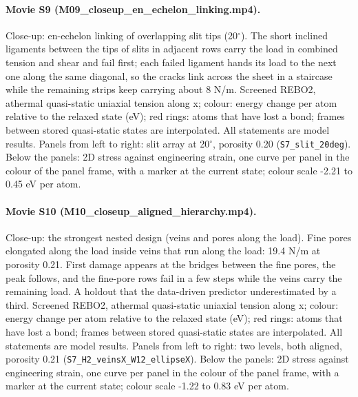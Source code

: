 \paragraph{Movie S9 (M09\_closeup\_en\_echelon\_linking.mp4).} Close-up: en-echelon linking of overlapping slit tips (20$^\circ$). The short inclined ligaments between the tips of slits in adjacent rows carry the load in combined tension and shear and fail first; each failed ligament hands its load to the next one along the same diagonal, so the cracks link across the sheet in a staircase while the remaining strips keep carrying about 8 N/m. Screened REBO2, athermal quasi-static uniaxial tension along x; colour: energy change per atom relative to the relaxed state (eV); red rings: atoms that have lost a bond; frames between stored quasi-static states are interpolated. All statements are model results. Panels from left to right: slit array at 20$^\circ$, porosity 0.20 (\texttt{S7\_slit\_20deg}). Below the panels: 2D stress against engineering strain, one curve per panel in the colour of the panel frame, with a marker at the current state; colour scale -2.21 to 0.45 eV per atom.

\paragraph{Movie S10 (M10\_closeup\_aligned\_hierarchy.mp4).} Close-up: the strongest nested design (veins and pores along the load). Fine pores elongated along the load inside veins that run along the load: 19.4 N/m at porosity 0.21. First damage appears at the bridges between the fine pores, the peak follows, and the fine-pore rows fail in a few steps while the veins carry the remaining load. A holdout that the data-driven predictor underestimated by a third. Screened REBO2, athermal quasi-static uniaxial tension along x; colour: energy change per atom relative to the relaxed state (eV); red rings: atoms that have lost a bond; frames between stored quasi-static states are interpolated. All statements are model results. Panels from left to right: two levels, both aligned, porosity 0.21 (\texttt{S7\_H2\_veinsX\_W12\_ellipseX}). Below the panels: 2D stress against engineering strain, one curve per panel in the colour of the panel frame, with a marker at the current state; colour scale -1.22 to 0.83 eV per atom.
